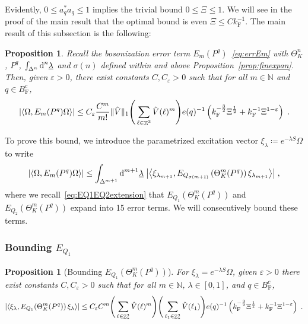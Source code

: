 \documentclass[12pt,a4paper]{article}
\numberwithin{equation}{section}
\newcommand{\NNN}{\mathbb{N}}
\newcommand{\ulambda}{\underline{\lambda}}
\newcommand{\1}{\mathbb{I}}
\newcommand{\di}{\textnormal{d}}
\newcommand{\F}{\mathrm{F}}
\DeclareMathOperator{\Z}{\mathbb{Z}}
\newcommand{\half}{\frac{1}{2}}
\newcommand{\eva}[1]{\left\langle #1 \right\rangle}
\theoremstyle{plain}
\newtheorem{proposition}[theorem]{Proposition}
\theoremstyle{definition}
\theoremstyle{remark}
\theoremstyle{plain}
\theoremstyle{definition}
\theoremstyle{remark}
\begin{document}
Evidently, $ 0 \le a_q^* a_q \le 1 $ implies the trivial bound $ 0 \le \Xi \le 1 $. We will see in the proof of the main result that the optimal bound is even $ \Xi \le C k_{\F}^{-1} $.
The main result of this subsection is the following:

\begin{proposition} \label{prop:finalEmest}
Recall the bosonization error term $E_m(P^q)$~\eqref{eq:errEm} with $ \Theta^n_K $, $ P^q $, $ \int_{\Delta^n} \di^n \ulambda $ and $ \sigma(n) $ defined within and above Proposition~\ref{prop:finexpan}. Then, given $ \varepsilon > 0 $, there exist constants $ C, C_\varepsilon > 0 $ such that for all $ m \in \NNN $ and $ q \in B_{\F}^c $,
\begin{equation} \label{eq:finalEmest}
	\abs{\eva{\Omega, E_m(P^q) \Omega}}
	\leq C_\varepsilon \frac{C^m}{m!} \Vert \hat{V} \Vert_1
		\Bigg( \sum_{\ell \in \Z^3} \hat{V}(\ell)^m \Bigg)
		e(q)^{-1} \left( k_{\F}^{-\frac{3}{2}} \Xi^\half
		+ k_{\F}^{-1}\Xi^{1-\varepsilon} \right) \;.
\end{equation}
\end{proposition}
To prove this bound, we introduce the parametrized excitation vector $ \xi_\lambda \coloneq e^{- \lambda S} \Omega $ to write
\begin{equation} \label{eq:errEm2}
	\abs{\eva{\Omega, E_m(P^q) \Omega }}
	\le \int_{\Delta^{m+1}} \di^{m+1} \underline{\lambda} \;
		\abs{\eva{\xi_{\lambda_{m+1}}, E_{Q_{\sigma(m+1)}}\left(\Theta^{m}_{K}(P^q)\right) \xi_{\lambda_{m+1}}}} \;,
\end{equation}
where we recall~\eqref{eq:EQ1EQ2extension} that $ E_{Q_1}\left(\Theta^m_{K}(P^q)\right) $ and $ E_{Q_2}\left(\Theta^m_{K}(P^q)\right) $ expand into 15 error terms. We will consecutively bound these terms.



\subsubsection{Bounding $E_{Q_1}$}

\begin{proposition}[Bounding $E_{Q_1}(\Theta^m_{K}(P^q))$]\label{prop:finEQ1est}
For $\xi_\lambda = e^{-\lambda S} \Omega$, given $ \varepsilon > 0 $ there exist constants $ C, C_\varepsilon > 0 $ such that for all $ m \in \NNN $, $ \lambda \in [0,1] $, and $ q \in B_{\F}^c $,
\begin{equation} \label{eq:finalEQ1est}
	\abs{\eva{\xi_\lambda, E_{Q_1}\!\left(\Theta^m_K(P^q)\right) \xi_\lambda}}
	\leq C_\varepsilon C^m \Bigg(\sum_{\ell \in \Z^3_*} \hat{V}(\ell)^m\Bigg)
		\Bigg( \sum_{\ell_1 \in \Z^3_*} \hat{V}(\ell_1) \Bigg)
		e(q)^{-1} \left( k_{\F}^{-\frac{3}{2}} \Xi^\half + k_{\F}^{-1}\Xi^{1-\varepsilon} \right) \;.
\end{equation}
\end{proposition}
\end{document}
